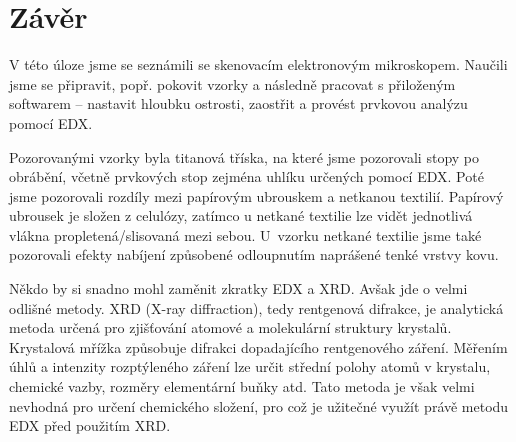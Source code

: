 \documentclass[a4paper,12pt]{article}
\begin{document}
\clearpage
\section{Závěr}\noindent
V této úloze jsme se seznámili se skenovacím elektronovým mikroskopem. Naučili 
jsme se připravit, popř. pokovit vzorky a následně pracovat s přiloženým 
softwarem -- nastavit hloubku ostrosti, zaostřit a provést prvkovou analýzu 
pomocí EDX.

Pozorovanými vzorky byla titanová tříska, na které jsme pozorovali stopy 
po obrábění, včetně prvkových stop zejména uhlíku určených pomocí EDX. Poté 
jsme pozorovali rozdíly mezi papírovým ubrouskem a netkanou textilií. Papírový 
ubrousek je složen z celulózy, zatímco u netkané textilie lze vidět jednotlivá 
vlákna propletená/slisovaná mezi sebou. U~vzor\-ku netkané textilie jsme také 
pozorovali efekty nabíjení způsobené odloupnutím naprášené tenké vrstvy kovu.


Někdo by si snadno mohl zaměnit zkratky EDX a XRD. Avšak jde o velmi odlišné 
metody. XRD (X-ray diffraction), tedy rentgenová difrakce, je analytická metoda 
určená pro zjišťování atomové a molekulární struktury krystalů. Krystalová 
mřížka způsobuje difrakci dopadajícího rentgenového záření. Měřením úhlů a 
intenzity rozptýleného záření lze určit střední polohy atomů v krystalu, 
chemické vazby, rozměry elementární buňky atd. Tato metoda je však velmi 
nevhodná pro určení chemického složení, pro což je užitečné využít právě metodu 
EDX před použitím XRD.
\end{document}
